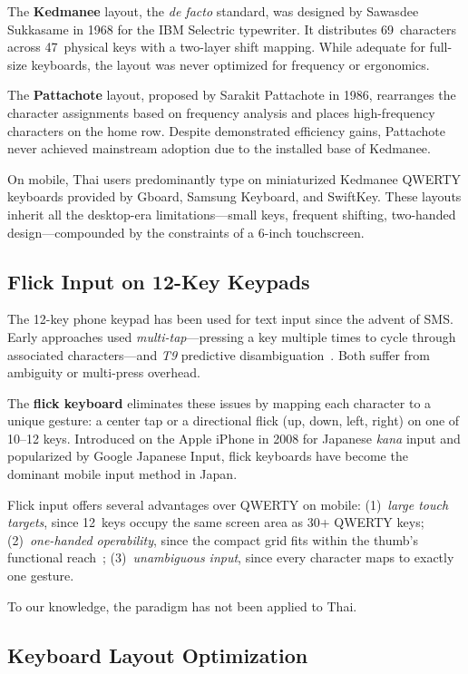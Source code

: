 \documentclass[10pt,twocolumn,a4paper]{article}
\begin{document}
The \textbf{Kedmanee} layout, the \emph{de facto} standard, was designed by Sawasdee Sukkasame in 1968 for the IBM Selectric typewriter.
It distributes 69~characters across 47~physical keys with a two-layer shift mapping.
While adequate for full-size keyboards, the layout was never optimized for frequency or ergonomics.

The \textbf{Pattachote} layout, proposed by Sarakit Pattachote in 1986, rearranges the character assignments based on frequency analysis and places high-frequency characters on the home row.
Despite demonstrated efficiency gains, Pattachote never achieved mainstream adoption due to the installed base of Kedmanee.

On mobile, Thai users predominantly type on miniaturized Kedmanee QWERTY keyboards provided by Gboard, Samsung Keyboard, and SwiftKey.
These layouts inherit all the desktop-era limitations---small keys, frequent shifting, two-handed design---compounded by the constraints of a 6-inch touchscreen.

\subsection{Flick Input on 12-Key Keypads}
\label{sec:bg_flick}

The 12-key phone keypad has been used for text input since the advent of SMS.
Early approaches used \emph{multi-tap}---pressing a key multiple times to cycle through associated characters---and \emph{T9} predictive disambiguation~\cite{grover1998,silfverberg2000}.
Both suffer from ambiguity or multi-press overhead.

The \textbf{flick keyboard} eliminates these issues by mapping each character to a unique gesture: a center tap or a directional flick (up, down, left, right) on one of 10--12 keys.
Introduced on the Apple iPhone in 2008 for Japanese \emph{kana} input and popularized by Google Japanese Input, flick keyboards have become the dominant mobile input method in Japan.

Flick input offers several advantages over QWERTY on mobile:
(1)~\emph{large touch targets}, since 12~keys occupy the same screen area as 30+ QWERTY keys;
(2)~\emph{one-handed operability}, since the compact grid fits within the thumb's functional reach~\cite{karlson2006,bergstrom2014};
(3)~\emph{unambiguous input}, since every character maps to exactly one gesture.

To our knowledge, the paradigm has not been applied to Thai.

\subsection{Keyboard Layout Optimization}
\label{sec:bg_optim}
\end{document}
